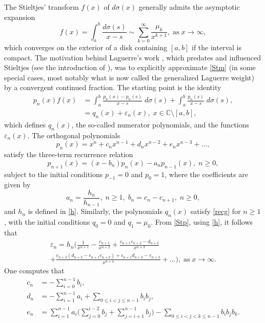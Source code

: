 \documentclass[10pt, reqno]{amsart}
\numberwithin{equation}{section}
\numberwithin{equation}{section}
\begin{document}
The Stieltjes' transform $f(x)$ of $d\sigma(x)$ generally admits the asymptotic expansion
\begin{equation} \label{Stm}
f(x)=\int_a^b \frac{d\sigma(s)}{x-s}\sim\sum_{k=0}^\infty \frac{\mu_k}{x^{k+1}},\;\mbox{as}\; x\to\infty,
\end{equation}
which converges on the exterior of a disk containing $[a,b]$ if the interval is compact. The motivation behind Laguerre's work \cite{La}, which predates and influenced Stieltjes (see the introduction of \cite{S}), was to explicitly approximate \eqref{Stm} (in some special cases, most notably what is now called the generalized Laguerre weight) by a convergent continued fraction. The starting point is the identity
\begin{align}
p_n(x)f(x)&=\int_a^b\frac{p_n(x)-p_n(s)}{x-s}\;d\sigma(s)+\int_a^b\frac{p_n(s)}{x-s}\;d\sigma(s),\nonumber\\
&=q_n(x)+\varepsilon_n(x),\; x\in\mathbb{C}\setminus [a,b],\label{Stp}
\end{align}
which defines $q_n(x)$, the so-called numerator polynomials, and the functions $\varepsilon_n(x)$. The orthogonal polynomials
\begin{equation} \label{cp}
p_n(x)=x^n+c_nx^{n-1}+d_nx^{n-2}+e_nx^{n-3}+ \ldots,
\end{equation}
satisfy the three-term recurrence relation
\begin{equation} \label{recg}
p_{n+1}(x)=(x-b_n)p_n(x)-a_n p_{n-1}(x),\; n\geq 0,
\end{equation}
subject to the initial conditions $p_{-1}=0$ and $p_0=1$, where the coefficients are given by
\begin{equation}
a_n=\frac{h_n}{h_{n-1}},\; n\geq 1,\; b_n=c_n-c_{n+1},\;n\geq 0,\label{abch}
\end{equation}
and $h_n$ is defined in \eqref{h}. Similarly, the polynomials $q_n(x)$ satisfy \eqref{recg} for $n\geq 1$, with the initial conditions $q_0=0$ and $q_1=\mu_0$. From \eqref{Stp}, using \eqref{h}, it follows that
\begin{multline} \label{cep}
\varepsilon_n=h_n\Big(\frac{1}{x^{n+1}}-\frac{c_{n+1}}{x^{n+2}}+\frac{c_{n+1}c_{n+2}-d_{n+2}}{x^{n+3}}\\+\frac{c_{n+3}(d_{n+2}-c_{n+1}c_{n+2})+c_{n+1}d_{n+3}-e_{n+3}}{x^{n+4}}+\ldots\Big),\;\mbox{as}\;x\to \infty.
\end{multline}
One computes that
\begin{align}
c_n&=-\sum_{i=0}^{n-1} b_i, \label{c}\\
d_n&=-\sum_{i=1}^{n-1}a_i+\sum_{0\leq i<j\leq n-1} b_ib_j,\label{d}\\
e_n&=\sum_{i=1}^{n-1}a_i\Bigg(\sum_{j=0}^{i-2}b_j+\sum_{j=i+1}^{n-1}b_j\Bigg)-\sum_{0\leq i<j<k\leq n-1} b_ib_jb_k. \label{e}
\end{align}
\end{document}
